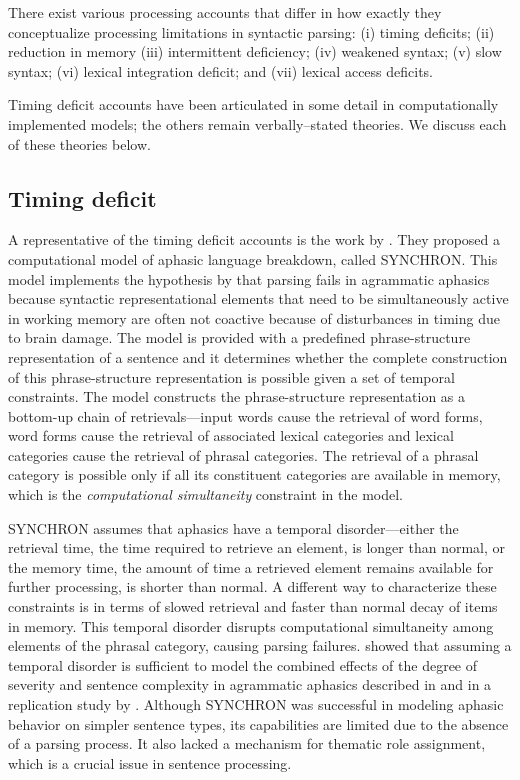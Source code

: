 \documentclass{cambridge7A}\usepackage[]{graphicx}\usepackage[]{color}
\begin{document}
There exist various processing accounts that differ in how exactly they conceptualize processing limitations in syntactic parsing:
(i) timing deficits;
(ii) reduction in memory
(iii) intermittent deficiency;
(iv) weakened syntax;
(v) slow syntax;
(vi) lexical integration deficit;
and (vii) lexical access deficits.

Timing deficit accounts have been articulated in some detail in computationally implemented models; the others remain verbally--stated theories. We discuss each of these theories below.

\subsection{Timing deficit}
A representative of the timing deficit accounts is the work by 
\cite{Haarmann-Kolk-1991}. They proposed a computational model of aphasic language breakdown, called SYNCHRON. This model implements the hypothesis by \cite{Kolk-vanGrunsven-1985} that parsing fails in agrammatic aphasics because syntactic representational elements that need to be simultaneously active in working memory are often not coactive because of disturbances in timing due to brain damage. The model is provided with a predefined phrase-structure representation of a sentence and it determines whether the complete construction of this phrase-structure representation is possible given a set of temporal constraints. The model constructs the phrase-structure representation as a bottom-up chain of retrievals---input words cause the retrieval of word forms, word forms cause the retrieval of associated lexical categories and lexical categories cause the retrieval of phrasal categories. The retrieval of a phrasal category is possible only if all its constituent categories are available in memory, which is the \emph{computational simultaneity} constraint in the model.

SYNCHRON assumes that aphasics have a temporal disorder---either the retrieval time, the time required to retrieve an element, is longer than normal, or the memory time, the amount of time a retrieved element remains available for further processing, is shorter than normal. 
A different way to characterize these constraints is in terms of slowed retrieval and faster than normal decay of items in memory.
This temporal disorder disrupts computational simultaneity among elements of the phrasal category, causing parsing failures. \cite{Haarmann-Kolk-1991} showed that assuming a temporal disorder is sufficient to model the combined effects of the degree of severity and sentence complexity in agrammatic aphasics described in \cite{Schwartz-EtAl-1980} and in a replication study by \cite{Kolk-vanGrunsven-1985}. Although SYNCHRON was successful in modeling aphasic behavior on simpler sentence types, its capabilities are limited due to the absence of a parsing process. It also lacked a mechanism for thematic role assignment, which is a crucial issue in sentence processing.
\end{document}
